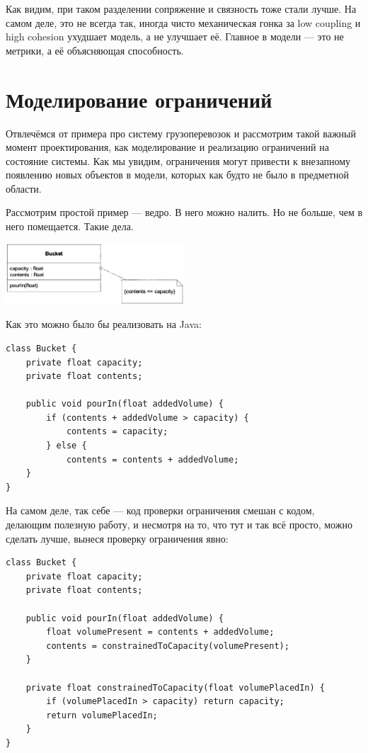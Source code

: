 \documentclass[a5paper]{article}
\begin{document}
Как видим, при таком разделении сопряжение и связность тоже стали лучше. На самом деле, это не всегда так, иногда чисто механическая гонка за low coupling и high cohesion ухудшает модель, а не улучшает её. Главное в модели --- это не метрики, а её объясняющая способность.

\section{Моделирование ограничений}

Отвлечёмся от примера про систему грузоперевозок и рассмотрим такой важный момент проектирования, как моделирование и реализацию ограничений на состояние системы. Как мы увидим, ограничения могут привести к внезапному появлению новых объектов в модели, которых как будто не было в предметной области. 

Рассмотрим простой пример --- ведро. В него можно налить. Но не больше, чем в него помещается. Такие дела.

\begin{center}
    \includegraphics[width=0.5\textwidth]{bucket.png}
\end{center}

Как это можно было бы реализовать на Java:

\begin{verbatim}
class Bucket {
    private float capacity;
    private float contents;

    public void pourIn(float addedVolume) {
        if (contents + addedVolume > capacity) {
            contents = capacity;
        } else {
            contents = contents + addedVolume;
    }
}
\end{verbatim}

На самом деле, так себе --- код проверки ограничения смешан с кодом, делающим полезную работу, и несмотря на то, что тут и так всё просто, можно сделать лучше, вынеся проверку ограничения явно:

\begin{verbatim}
class Bucket {
    private float capacity;
    private float contents;

    public void pourIn(float addedVolume) {
        float volumePresent = contents + addedVolume;
        contents = constrainedToCapacity(volumePresent);
    }

    private float constrainedToCapacity(float volumePlacedIn) {
        if (volumePlacedIn > capacity) return capacity;
        return volumePlacedIn;
    }
} 
\end{verbatim}
\end{document}
